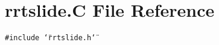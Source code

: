 \section{rrtslide.C File Reference}
\label{rrtslide_8C}
{\tt \#include \char`\"{}rrtslide.h\char`\"{}}\par
